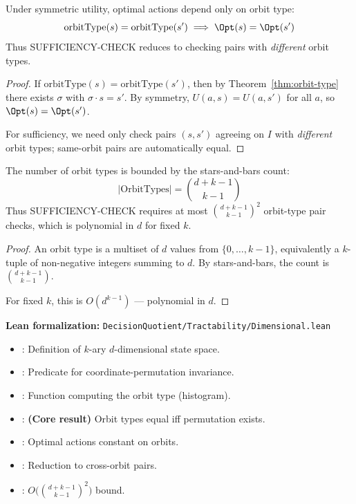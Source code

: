 \begin{theorem}\label{thm:symmetric-reduction}
Under symmetric utility, optimal actions depend only on orbit type:
\[
\text{orbitType}(s) = \text{orbitType}(s') \implies \Opt(s) = \Opt(s')
\]
Thus SUFFICIENCY-CHECK reduces to checking pairs with \emph{different} orbit types.
\end{theorem}

\begin{proof}
If $\text{orbitType}(s) = \text{orbitType}(s')$, then by Theorem~\ref{thm:orbit-type} there exists $\sigma$ with $\sigma \cdot s = s'$. By symmetry, $U(a, s) = U(a, s')$ for all $a$, so $\Opt(s) = \Opt(s')$.

For sufficiency, we need only check pairs $(s, s')$ agreeing on $I$ with \emph{different} orbit types; same-orbit pairs are automatically equal.
\end{proof}

\begin{theorem}\label{thm:symmetric-complexity}
The number of orbit types is bounded by the stars-and-bars count:
\[
|\text{OrbitTypes}| = \binom{d + k - 1}{k - 1}
\]
Thus SUFFICIENCY-CHECK requires at most $\binom{d + k - 1}{k - 1}^2$ orbit-type pair checks, which is polynomial in $d$ for fixed $k$.
\end{theorem}

\begin{proof}
An orbit type is a multiset of $d$ values from $\{0, \ldots, k-1\}$, equivalently a $k$-tuple of non-negative integers summing to $d$. By stars-and-bars, the count is $\binom{d + k - 1}{k - 1}$.

For fixed $k$, this is $O(d^{k-1})$ --- polynomial in $d$.
\end{proof}

\noindent\textbf{Lean formalization:} \texttt{DecisionQuotient/Tractability/Dimensional.lean}
\begin{itemize}
\item {}: Definition of $k$-ary $d$-dimensional state space.
\item {}: Predicate for coordinate-permutation invariance.
\item {}: Function computing the orbit type (histogram).
\item {}: \textbf{(Core result)} Orbit types equal iff permutation exists.
\item {}: Optimal actions constant on orbits.
\item {}: Reduction to cross-orbit pairs.
\item {}: $O\bigl(\binom{d+k-1}{k-1}^2\bigr)$ bound.
\end{itemize}

